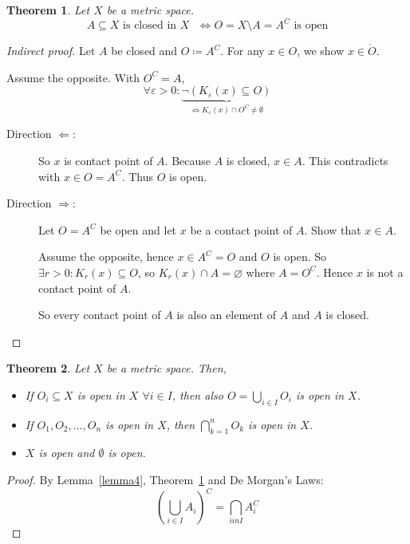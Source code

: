 \documentclass{article}
\newtheorem{theorem}{Theorem}  \numberwithin{theorem}{section}
\begin{document}
\begin{theorem}
  \label{saetzchen1}
  Let $X$ be a metric space.
  \[ A \subseteq X \text{ is closed in $X$ } \iff O = X \setminus A = A^C \text{ is open} \]
\end{theorem}

\begin{proof}[Indirect proof]
  Let $A$ be closed and $O \coloneqq A^C$. For any $x \in O$, we show $x \in \mathring O$.

  Assume the opposite. With $O^C = A$,
  \[ \forall \varepsilon > 0: \underbrace{\neg \left(K_{\varepsilon}(x) \subseteq O\right)}_{\iff K_{\varepsilon}(x) \cap O^C \neq \emptyset} \]

  \begin{description}
    \item[Direction $\mathbf\Leftarrow$:]
      So $x$ is contact point of $A$.
      Because $A$ is closed, $x \in A$.
      This contradicts with $x \in O = A^C$. Thus $O$ is open.

    \item[Direction $\mathbf\Rightarrow$:]
      Let $O = A^C$ be open and let $x$ be a contact point of $A$. Show that $x \in A$.

      Assume the opposite, hence $x \in A^C = O$ and $O$ is open.
      So $\exists r > 0: K_r(x) \subseteq O$, so $K_r(x) \cap A = \diameter$ where $A = O^C$.
      Hence $x$ is not a contact point of $A$.

      So every contact point of $A$ is also an element of $A$ and $A$ is closed.
  \end{description}
\end{proof}

\begin{theorem}
  \label{satz2}
  Let $X$ be a metric space. Then,
  \begin{itemize}
  	\item
  	  If $O_i \subseteq X$ is open in $X$ $\forall i \in I$,
  	  then also $O = \bigcup_{i \in I} O_i$ is open in $X$.
  	\item
  	  If $O_1, O_2, \dots, O_n$ is open in $X$, then $\bigcap_{k=1}^n O_k$ is open in $X$.
  	\item
  	  $X$ is open and $\emptyset$ is open.
  \end{itemize}
\end{theorem}

\begin{proof}
  By Lemma~\ref{lemma4}, Theorem~\ref{saetzchen1} and De Morgan's Laws:
  \[ \left(\bigcup_{i \in I} A_i\right)^C = \bigcap_{i in I} A_i^C \]
\end{proof}
\end{document}
